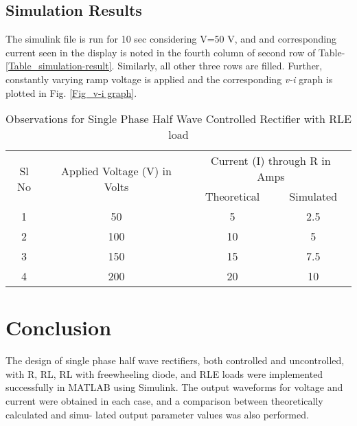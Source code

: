 \subsection{Simulation Results}
\hspace{1.5cm} The simulink file is run for 10 sec considering V=50 V, and and corresponding current seen in the display is noted in the fourth column of second row of Table-\ref{Table_simulation-result}. Similarly, all other three rows are filled.  Further, constantly varying ramp voltage is applied and the corresponding \textit{v-i} graph is plotted in Fig. \ref{Fig_v-i graph}.




\begin{table}[h]
    \renewcommand{\arraystretch}{1.3}
    \caption{Observations for Single Phase Half Wave Controlled Rectifier with RLE load}
    \centering
    \begin{tabular}{|c|c|c|c|}
        \hline
        \multirow{2}{*}{Sl No} & \multirow{2}{*}{Applied Voltage (V) in Volts} & \multicolumn{2}{c|}{Current (I) through R in Amps}             \\
        \cline{3-4}
                               &                                               & Theoretical                                        & Simulated \\
        \hline
        1                      & 50                                            & 5                                                  & 2.5       \\
        \hline
        2                      & 100                                           & 10                                                 & 5         \\
        \hline
        3                      & 150                                           & 15                                                 & 7.5       \\
        \hline
        4                      & 200                                           & 20                                                 & 10        \\
        \hline
    \end{tabular}
\end{table}


\section{Conclusion}
\hspace{\parindent}
The design of single phase half wave rectifiers, both controlled and
uncontrolled, with R, RL, RL with freewheeling diode, and RLE
loads were implemented successfully in MATLAB using Simulink.
The output waveforms for voltage and current were obtained in each
case, and a comparison between theoretically calculated and simu-
lated output parameter values was also performed.

\pagebreak